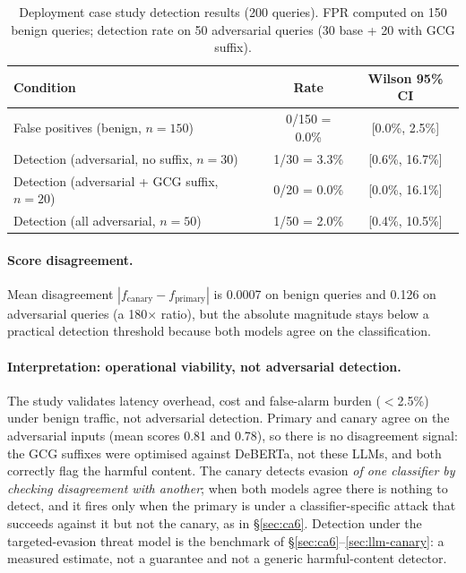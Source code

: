 \documentclass{article}
\begin{document}
\begin{table}[h]
\centering
\small
\caption{Deployment case study detection results (200 queries). FPR computed on 150 benign queries; detection rate on 50 adversarial queries (30 base + 20 with GCG suffix).}
\label{tab:deployment-case}
\begin{tabular}{lcc}
\toprule
\textbf{Condition} & \textbf{Rate} & \textbf{Wilson 95\% CI} \\
\midrule
False positives (benign, $n{=}150$) & 0/150 = 0.0\% & [0.0\%, 2.5\%] \\
Detection (adversarial, no suffix, $n{=}30$) & 1/30 = 3.3\% & [0.6\%, 16.7\%] \\
Detection (adversarial + GCG suffix, $n{=}20$) & 0/20 = 0.0\% & [0.0\%, 16.1\%] \\
Detection (all adversarial, $n{=}50$) & 1/50 = 2.0\% & [0.4\%, 10.5\%] \\
\bottomrule
\end{tabular}
\end{table}

\paragraph{Score disagreement.} Mean disagreement $|f_{\text{canary}} - f_{\text{primary}}|$ is 0.0007 on benign queries and 0.126 on adversarial queries (a 180$\times$ ratio), but the absolute magnitude stays below a practical detection threshold because both models agree on the classification.

\paragraph{Interpretation: operational viability, not adversarial detection.} The study validates latency overhead, cost and false-alarm burden ($<$2.5\%) under benign traffic, not adversarial detection. Primary and canary agree on the adversarial inputs (mean scores 0.81 and 0.78), so there is no disagreement signal: the GCG suffixes were optimised against DeBERTa, not these LLMs, and both correctly flag the harmful content. The canary detects evasion \emph{of one classifier by checking disagreement with another}; when both models agree there is nothing to detect, and it fires only when the primary is under a classifier-specific attack that succeeds against it but not the canary, as in \S\ref{sec:ca6}. Detection under the targeted-evasion threat model is the benchmark of \S\ref{sec:ca6}--\ref{sec:llm-canary}: a measured estimate, not a guarantee and not a generic harmful-content detector.
\end{document}
